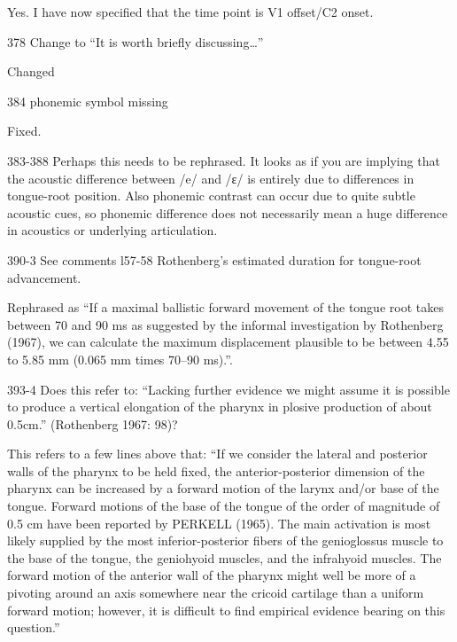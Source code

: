 \documentclass[]{article}
\begin{document}
\color{plum}

Yes. I have now specified that the time point is V1 offset/C2 onset.
\color{black}

378 Change to ``It is worth briefly discussing\ldots{}''

\color{plum}

Changed \color{black}

384 phonemic symbol missing

\color{plum}

Fixed. \color{black}

383-388 Perhaps this needs to be rephrased. It looks as if you are
implying that the acoustic difference between /e/ and /ɛ/ is entirely
due to differences in tongue-root position. Also phonemic contrast can
occur due to quite subtle acoustic cues, so phonemic difference does not
necessarily mean a huge difference in acoustics or underlying
articulation.

390-3 See comments l57-58 Rothenberg's estimated duration for
tongue-root advancement.

\color{plum}

Rephrased as ``If a maximal ballistic forward movement of the tongue
root takes between 70 and 90 ms as suggested by the informal
investigation by Rothenberg (1967), we can calculate the maximum
displacement plausible to be between 4.55 to 5.85 mm (0.065 mm times
70--90 ms).''. \color{black}

393-4 Does this refer to: ``Lacking further evidence we might assume it
is possible to produce a vertical elongation of the pharynx in plosive
production of about 0.5cm.'' (Rothenberg 1967: 98)?

\color{plum}

This refers to a few lines above that: ``If we consider the lateral and
posterior walls of the pharynx to be held fixed, the anterior-posterior
dimension of the pharynx can be increased by a forward motion of the
larynx and/or base of the tongue. Forward motions of the base of the
tongue of the order of magnitude of 0.5 cm have been reported by PERKELL
(1965). The main activation is most likely supplied by the most
inferior-posterior fibers of the genioglossus muscle to the base of the
tongue, the geniohyoid muscles, and the infrahyoid muscles. The forward
motion of the anterior wall of the pharynx might well be more of a
pivoting around an axis somewhere near the cricoid cartilage than a
uniform forward motion; however, it is difficult to find empirical
evidence bearing on this question.'' \color{black}
\end{document}
